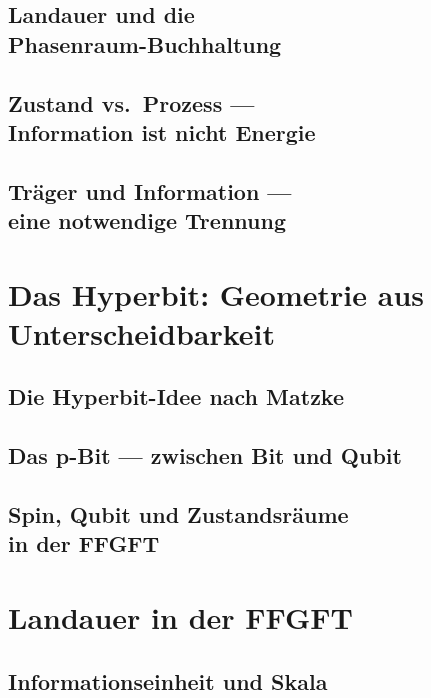 \documentclass[11pt,twoside,openright]{book}
\theoremstyle{plain}
\theoremstyle{definition}
\begin{document}
\chapter[Landauer und die Phasenraum-Buchhaltung]{Landauer und die\\
Phasenraum-Buchhaltung}


\chapter[Zustand vs.\ Prozess]{Zustand vs.\ Prozess ---\\
Information ist nicht Energie}


\chapter[Träger und Information]{Träger und Information ---\\
eine notwendige Trennung}


\part{Das Hyperbit: Geometrie aus Unterscheidbarkeit}

\chapter{Die Hyperbit-Idee nach Matzke}


\chapter{Das p-Bit --- zwischen Bit und Qubit}


\chapter[Spin, Qubit und Zustandsräume]{Spin, Qubit und Zustandsräume\\
in der FFGFT}


\part{Landauer in der FFGFT}

\chapter{Informationseinheit und Skala}

\end{document}
